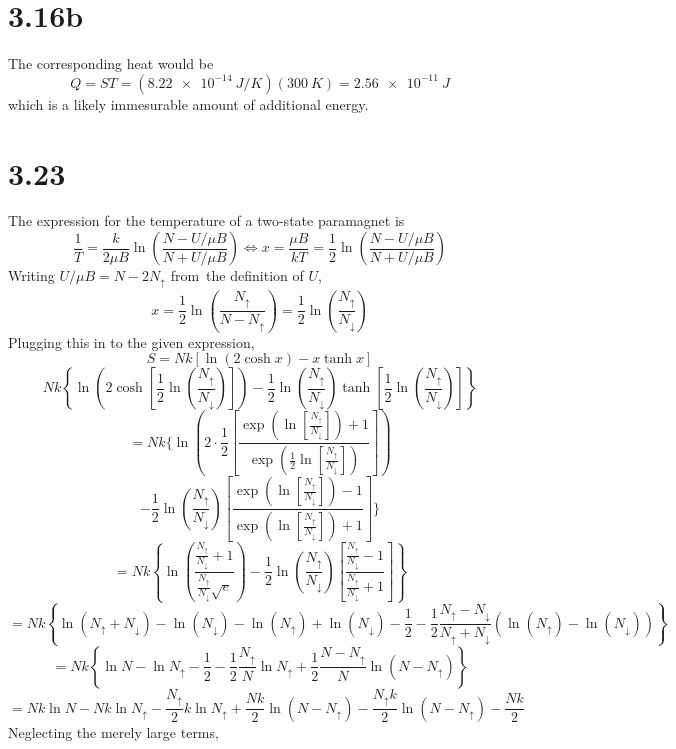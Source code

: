 \documentclass{article}
\begin{document}
\section*{3.16b}
The corresponding heat would be
\[Q=ST=(\SI{8.22e-14}{J/K})(\SI{300}{K})=\SI{2.56e-11}{J}\]
which is a likely immesurable amount of additional energy.

\section*{3.23}
The expression for the temperature of a two-state paramagnet is
\[\frac{1}{T}=\frac{k}{2\mu B}\ln\left( \frac{N-U/\mu B}{N+U/\mu B} \right)\Leftrightarrow x=\frac{\mu B}{kT}=\frac{1}{2}\ln\left( \frac{N-U/\mu B}{N+U/\mu B} \right)\]
Writing $U/\mu B=N-2N_{\uparrow}$ from\ the definition of $U$,
\[x=\frac{1}{2}\ln\left( \frac{N_{\uparrow}}{N-N_{\uparrow}} \right)=\frac{1}{2}\ln\left( \frac{N_{\uparrow}}{N_{\downarrow}} \right)\]
Plugging this in to the given expression,
\[S=Nk\left[  \ln\left(  2\cosh x\right)-x\tanh x\right]\]\[Nk\left\{\ln\left( 2\cosh\left[ \frac{1}{2}\ln\left( \frac{N_{\uparrow}}{N_{\downarrow}} \right) \right]\right) -\frac{1}{2}\ln\left( \frac{N_{\uparrow}}{N_{\downarrow}} \right)\tanh\left[  \frac{1}{2}\ln\left( \frac{N_{\uparrow}}{N_{\downarrow}} \right)  \right] \right\}\]
\[=Nk\bigg\{ \ln\left( 2\cdot\frac{1}{2}\left[ \frac{\exp\left( \ln\left[ \frac{N_{\uparrow}}{N_{\downarrow}} \right] \right)+1}{\exp\left( \frac{1}{2}\ln\left[ \frac{N_{\uparrow}}{N_{\downarrow}} \right] \right)}\right] \right)\]
\[-\frac{1}{2}\ln\left( \frac{N_{\uparrow}}{N_{\downarrow}} \right)\left[ \frac{\exp\left( \ln\left[ \frac{N_{\uparrow}}{N_{\downarrow}} \right] \right)-1}{\exp\left( \ln\left[ \frac{N_{\uparrow}}{N_{\downarrow}} \right]\right)+1} \right]\bigg\}\]
\[=Nk\left\{ \ln\left( \frac{\frac{N_{\uparrow}}{N_{\downarrow}}+1}{\frac{N_{\uparrow}}{N_{\downarrow}}\sqrt{e}}\right)-\frac{1}{2}\ln\left( \frac{N_{\uparrow}}{N_{\downarrow}} \right)\left[ \frac{\frac{N_{\uparrow}}{N_{\downarrow}}-1}{\frac{N_{\uparrow}}{N_{\downarrow}}+1} \right]\right\}\]
\[=Nk\left\{ \ln(N_{\uparrow}+N_{\downarrow})-\ln(N_{\downarrow})-\ln(N_{\uparrow})+\ln(N_{\downarrow})-\frac{1}{2}-\frac{1}{2}\frac{N_{\uparrow}-N_{\downarrow}}{N_{\uparrow}+N_{\downarrow}}\left( \ln(N_{\uparrow})-\ln(N_{\downarrow}) \right) \right\}\]
\[=Nk\left\{ \ln N - \ln N_{\uparrow}-\frac{1}{2}-\frac{1}{2}\frac{N_{\uparrow}}{N}\ln N_{\uparrow}+\frac{1}{2}\frac{N-N_{\uparrow}}{N}\ln(N-N_{\uparrow})\right\}\]
\[=Nk\ln N-Nk\ln N_{\uparrow}-\frac{N_{\uparrow}}{2}k\ln N_{\uparrow}+\frac{Nk}{2}\ln(N-N_{\uparrow})-\frac{N_{\uparrow}k}{2}\ln(N-N_{\uparrow})-\frac{Nk}{2}\]
Neglecting the merely large terms,
\end{document}
